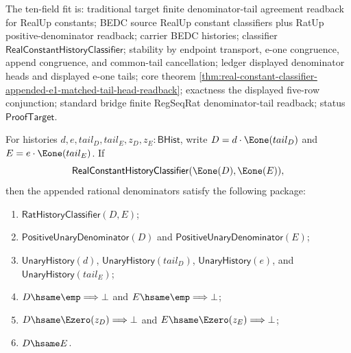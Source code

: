 
The ten-field fit is: traditional target finite denominator-tail agreement
readback for RealUp constants; BEDC source RealUp constant classifiers plus
RatUp positive-denominator readback; carrier BEDC histories; classifier
$\mathsf{RealConstantHistoryClassifier}$; stability by endpoint transport,
e-one congruence, append congruence, and common-tail cancellation; ledger
displayed denominator heads and displayed e-one tails; core theorem
\autoref{thm:real-constant-classifier-appended-e1-matched-tail-head-readback};
exactness the displayed five-row conjunction; standard bridge finite
RegSeqRat denominator-tail readback; status $\mathsf{ProofTarget}$.

\begin{theorem}
\label{thm:real-constant-history-classifier-append-e1-tail-denominator-package}
For histories $d,e,tail_D,tail_E,z_D,z_E:\mathsf{BHist}$, write
$D=d\cdot\Eone(tail_D)$ and $E=e\cdot\Eone(tail_E)$. If
$$
\mathsf{RealConstantHistoryClassifier}(\Eone(D),\Eone(E)),
$$
then the appended rational denominators satisfy the following package:
\begin{enumerate}
  \item $\mathsf{RatHistoryClassifier}(D,E)$;
  \item $\mathsf{PositiveUnaryDenominator}(D)$ and
  $\mathsf{PositiveUnaryDenominator}(E)$;
  \item $\mathsf{UnaryHistory}(d)$, $\mathsf{UnaryHistory}(tail_D)$,
  $\mathsf{UnaryHistory}(e)$, and $\mathsf{UnaryHistory}(tail_E)$;
  \item $D\hsame\emp\Longrightarrow\bot$ and
  $E\hsame\emp\Longrightarrow\bot$;
  \item $D\hsame\Ezero(z_D)\Longrightarrow\bot$ and
  $E\hsame\Ezero(z_E)\Longrightarrow\bot$;
  \item $D\hsame E$.
\end{enumerate}
\end{theorem}
